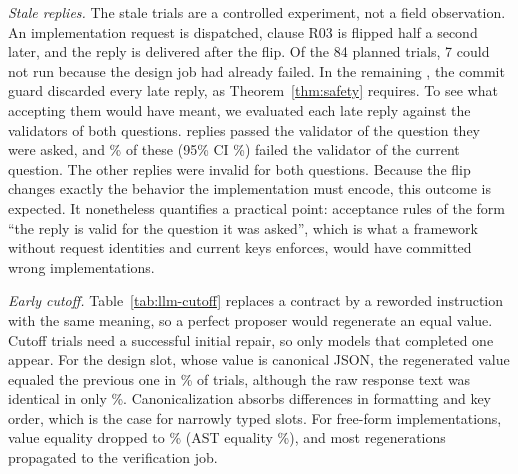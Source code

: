 \emph{Stale replies.} The stale trials are a controlled experiment, not a field observation. An implementation request is dispatched, clause R03 is flipped half a second later, and the reply is delivered after the flip. Of the 84 planned trials, 7 could not run because the design job had already failed. In the remaining \LlmStaleTrials{}, the commit guard discarded every late reply, as Theorem~\ref{thm:safety} requires. To see what accepting them would have meant, we evaluated each late reply against the validators of both questions. \LlmStaleOldValid{} replies passed the validator of the question they were asked, and \LlmStaleWrongPct\% of these (95\% CI \LlmStaleWrongCI\%) failed the validator of the current question. The other replies were invalid for both questions. Because the flip changes exactly the behavior the implementation must encode, this outcome is expected. It nonetheless quantifies a practical point: acceptance rules of the form ``the reply is valid for the question it was asked'', which is what a framework without request identities and current keys enforces, would have committed \LlmStaleOldValid{} wrong implementations.



\emph{Early cutoff.} Table~\ref{tab:llm-cutoff} replaces a contract by a reworded instruction with the same meaning, so a perfect proposer would regenerate an equal value. Cutoff trials need a successful initial repair, so only models that completed one appear. For the design slot, whose value is canonical JSON, the regenerated value equaled the previous one in \LlmCutoffDesignValuePct\% of trials, although the raw response text was identical in only \LlmCutoffDesignRawPct\%. Canonicalization absorbs differences in formatting and key order, which is the case for narrowly typed slots. For free-form implementations, value equality dropped to \LlmCutoffImplValuePct\% (AST equality \LlmCutoffImplAstPct\%), and most regenerations propagated to the verification job.



